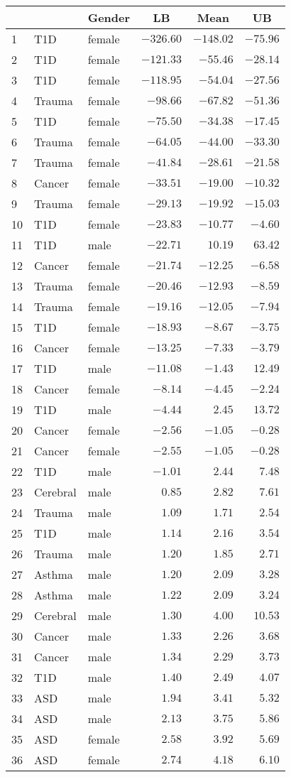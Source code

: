\begin{table}[!tbp]
\begin{center}
\begin{tabular}{lllrrr}
\hline\hline
\multicolumn{1}{l}{}&\multicolumn{1}{c}{}&\multicolumn{1}{c}{Gender}&\multicolumn{1}{c}{LB}&\multicolumn{1}{c}{Mean}&\multicolumn{1}{c}{UB}\tabularnewline
\hline
1&T1D&female&$-326.60$&$-148.02$&$-75.96$\tabularnewline
2&T1D&female&$-121.33$&$ -55.46$&$-28.14$\tabularnewline
3&T1D&female&$-118.95$&$ -54.04$&$-27.56$\tabularnewline
4&Trauma&female&$ -98.66$&$ -67.82$&$-51.36$\tabularnewline
5&T1D&female&$ -75.50$&$ -34.38$&$-17.45$\tabularnewline
6&Trauma&female&$ -64.05$&$ -44.00$&$-33.30$\tabularnewline
7&Trauma&female&$ -41.84$&$ -28.61$&$-21.58$\tabularnewline
8&Cancer&female&$ -33.51$&$ -19.00$&$-10.32$\tabularnewline
9&Trauma&female&$ -29.13$&$ -19.92$&$-15.03$\tabularnewline
10&T1D&female&$ -23.83$&$ -10.77$&$ -4.60$\tabularnewline
11&T1D&male&$ -22.71$&$  10.19$&$ 63.42$\tabularnewline
12&Cancer&female&$ -21.74$&$ -12.25$&$ -6.58$\tabularnewline
13&Trauma&female&$ -20.46$&$ -12.93$&$ -8.59$\tabularnewline
14&Trauma&female&$ -19.16$&$ -12.05$&$ -7.94$\tabularnewline
15&T1D&female&$ -18.93$&$  -8.67$&$ -3.75$\tabularnewline
16&Cancer&female&$ -13.25$&$  -7.33$&$ -3.79$\tabularnewline
17&T1D&male&$ -11.08$&$  -1.43$&$ 12.49$\tabularnewline
18&Cancer&female&$  -8.14$&$  -4.45$&$ -2.24$\tabularnewline
19&T1D&male&$  -4.44$&$   2.45$&$ 13.72$\tabularnewline
20&Cancer&female&$  -2.56$&$  -1.05$&$ -0.28$\tabularnewline
21&Cancer&female&$  -2.55$&$  -1.05$&$ -0.28$\tabularnewline
22&T1D&male&$  -1.01$&$   2.44$&$  7.48$\tabularnewline
23&Cerebral&male&$   0.85$&$   2.82$&$  7.61$\tabularnewline
24&Trauma&male&$   1.09$&$   1.71$&$  2.54$\tabularnewline
25&T1D&male&$   1.14$&$   2.16$&$  3.54$\tabularnewline
26&Trauma&male&$   1.20$&$   1.85$&$  2.71$\tabularnewline
27&Asthma&male&$   1.20$&$   2.09$&$  3.28$\tabularnewline
28&Asthma&male&$   1.22$&$   2.09$&$  3.24$\tabularnewline
29&Cerebral&male&$   1.30$&$   4.00$&$ 10.53$\tabularnewline
30&Cancer&male&$   1.33$&$   2.26$&$  3.68$\tabularnewline
31&Cancer&male&$   1.34$&$   2.29$&$  3.73$\tabularnewline
32&T1D&male&$   1.40$&$   2.49$&$  4.07$\tabularnewline
33&ASD&male&$   1.94$&$   3.41$&$  5.32$\tabularnewline
34&ASD&male&$   2.13$&$   3.75$&$  5.86$\tabularnewline
35&ASD&female&$   2.58$&$   3.92$&$  5.69$\tabularnewline
36&ASD&female&$   2.74$&$   4.18$&$  6.10$\tabularnewline

\end{tabular}
\end{center}
\end{table}
